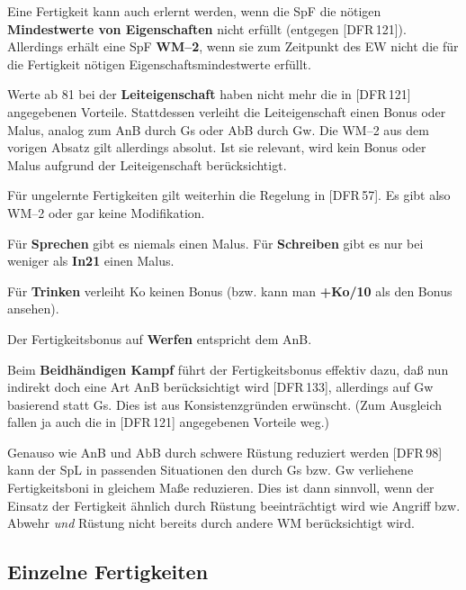 \documentclass[10pt,a4paper,germanpar]{article}
\begin{document}
Eine Fertigkeit kann auch erlernt werden, wenn die SpF die nötigen
\textbf{Mindestwerte von Eigenschaften} nicht erfüllt (entgegen
[DFR\,121]). Allerdings erhält eine SpF \textbf{WM--2}, wenn sie zum
Zeitpunkt des EW nicht die für die Fertigkeit nötigen
Eigenschaftsmindestwerte erfüllt.

Werte ab 81 bei der \textbf{Leiteigenschaft} haben nicht mehr die in
[DFR\,121] angegebenen Vorteile. Stattdessen verleiht die
Leiteigenschaft einen Bonus oder Malus, analog zum AnB durch Gs oder
AbB durch Gw. Die WM--2 aus dem vorigen Absatz gilt allerdings
absolut. Ist sie relevant, wird kein Bonus oder Malus aufgrund der
Leiteigenschaft berücksichtigt.

Für ungelernte Fertigkeiten gilt weiterhin die Regelung in
[DFR\,57]. Es gibt also WM--2 oder gar keine Modifikation.

Für \textbf{Sprechen} gibt es niemals einen Malus. Für
\textbf{Schreiben} gibt es nur bei weniger als \textbf{In21} einen
Malus.

Für \textbf{Trinken} verleiht Ko keinen Bonus (bzw. kann man
\textbf{+Ko/10} als den Bonus ansehen).

Der Fertigkeitsbonus auf \textbf{Werfen} entspricht dem AnB.

Beim \textbf{Beidhändigen Kampf} führt der Fertigkeitsbonus effektiv
dazu, daß nun indirekt doch eine Art AnB berücksichtigt wird
[DFR\,133], allerdings auf Gw basierend statt Gs. Dies ist aus
Konsistenzgründen erwünscht. (Zum Ausgleich fallen ja auch die in
[DFR\,121] angegebenen Vorteile weg.)

Genauso wie AnB und AbB durch schwere Rüstung reduziert werden [DFR\,98]
kann der SpL in passenden Situationen den durch Gs bzw. Gw verliehene
Fertigkeitsboni in gleichem Maße reduzieren. Dies ist dann sinnvoll,
wenn der Einsatz der Fertigkeit ähnlich durch Rüstung beeinträchtigt
wird wie Angriff bzw. Abwehr \emph{und} Rüstung nicht bereits durch
andere WM berücksichtigt wird.

\subsection{Einzelne Fertigkeiten}
\end{document}

